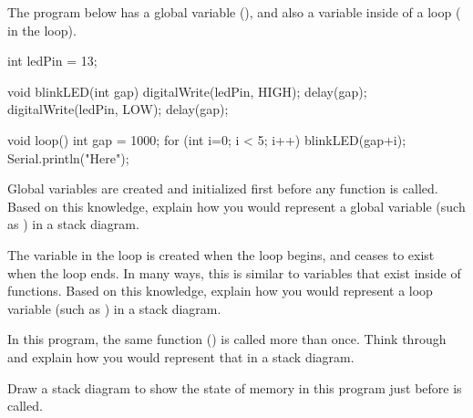 \newpage


The program below has a global variable (), and also a variable
inside of a loop ( in the  loop).


\begin{javalst}

  int ledPin = 13;
  
  void blinkLED(int gap) {
    digitalWrite(ledPin, HIGH);
    delay(gap);
    digitalWrite(ledPin, LOW);
    delay(gap);
  }
  
  void loop() {
    int gap = 1000;
    for (int i=0; i < 5; i++) {
      blinkLED(gap+i);
    }
    Serial.println("Here");
  }

\end{javalst}

\Q Global variables are created and initialized first before any function is
called. Based on this knowledge, explain how you would represent a global
variable (such as ) in a stack diagram.

\vspace{2cm}

\Q The variable  in the  loop is created when the 
loop begins, and ceases to exist when the  loop ends. In many ways,
this is similar to variables that exist inside of functions. Based on this
knowledge, explain how you would represent a loop variable (such as ) in
a stack diagram.

\vspace{2cm}


\Q In this program, the same function () is called more than
once. Think through and explain how you would represent that in a stack diagram.

\vspace{2cm}

\Q \label{drawing}
Draw a stack diagram to show the state of memory in this program just before  is called.


\newpage


